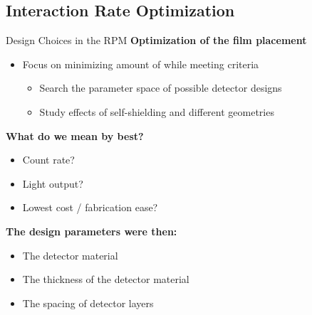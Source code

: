 \subsection{Interaction Rate Optimization}
\begin{frame}{Design Choices in the RPM}
  \large
  \textbf{Optimization of the film placement}
  \normalsize
  \begin{itemize}
    \item Focus on minimizing amount of  while meeting criteria
    \begin{itemize}
      \item Search the parameter space of possible detector designs
      \item Study effects of self-shielding and different geometries
    \end{itemize}
  \end{itemize}
\textbf{What do we mean by best?}
\begin{itemize}
	\small
  \item Count rate? 
  \item Light output?
	\item Lowest cost / fabrication ease?
\end{itemize}
\textbf{The design parameters were then:}
\begin{itemize}
	\small
  \item The detector material
  \item The thickness of the detector material
  \item The spacing of detector layers
\end{itemize}
\end{frame}
